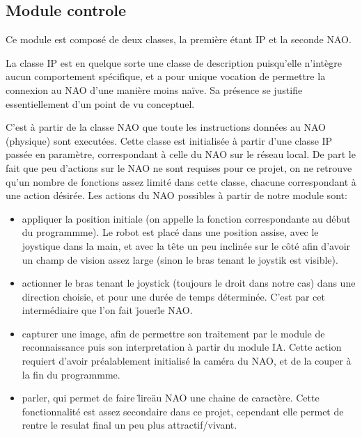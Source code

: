 \subsection{Module controle}
\label{sub:Module controle}
  \par Ce module est composé de deux classes, la première étant IP et la seconde NAO.

  \par La classe IP est en quelque sorte une classe de description puisqu'elle n'intègre aucun comportement spécifique, et a pour unique vocation de permettre la connexion au NAO d'une manière moins naïve.
  Sa présence se justifie essentiellement d'un point de vu conceptuel.

  \par C'est à partir de la classe NAO que toute les instructions données au NAO (physique) sont executées.
  Cette classe est initialisée à partir d'une classe IP passée en paramètre, correspondant à celle du NAO sur le réseau local.
  De part le fait que peu d'actions sur le NAO ne sont requises pour ce projet, on ne retrouve qu'un nombre de fonctions assez limité dans cette classe, chacune correspondant à une action désirée.
  Les actions du NAO possibles à partir de notre module sont:
  \begin{itemize}
    \item appliquer la position initiale (on appelle la fonction correspondante au début du programmme).
    Le robot est placé dans une position assise, avec le joystique dans la main, et avec la tête un peu inclinée sur le côté afin d'avoir un champ de vision assez large (sinon le bras tenant le joystik est visible).
    \item actionner le bras tenant le joystick (toujours le droit dans notre cas) dans une direction choisie, et pour une durée de temps déterminée.
    C'est par cet intermédiaire que l'on fait \"jouer\" le NAO.
    \item capturer une image, afin de permettre son traitement par le module de reconnaissance puis son interpretation à partir du module IA.
    Cette action requiert d'avoir préalablement initialisé la caméra du NAO, et de la couper à la fin du programmme.
    \item parler, qui permet de faire \"lire\" au NAO une chaine de caractère.
    Cette fonctionnalité est assez secondaire dans ce projet, cependant elle permet de rentre le resulat final un peu plus attractif/vivant.
  \end{itemize}
